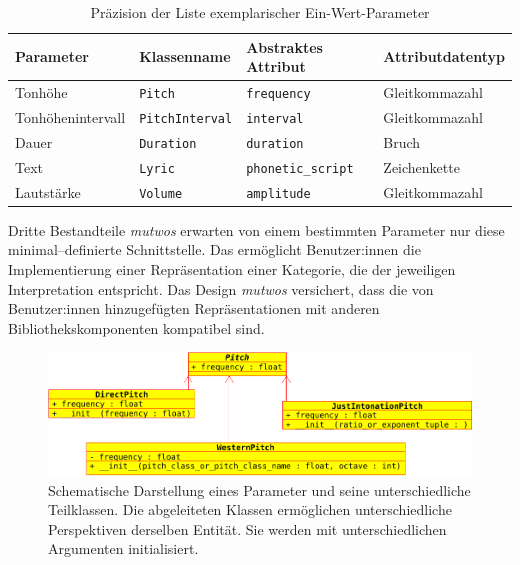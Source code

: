 \documentclass[12pt,a4paper,ngerman]{article}
\begin{document}
\begin{table}[H]
    \begin{center}
        \begin{tabular}{l l l l} 
            \hline
            Parameter & Klassenname & Abstraktes Attribut & Attributdatentyp \\ [0.5ex] 
            \hline\hline
            Tonhöhe & \texttt{Pitch} & \texttt{frequency} & Gleitkommazahl \\ 
            Tonhöhenintervall & \texttt{PitchInterval} & \texttt{interval} & Gleitkommazahl \\ 
            Dauer & \texttt{Duration} & \texttt{duration} & Bruch \\ 
            Text & \texttt{Lyric} & \texttt{phonetic\_script} & Zeichenkette \\ 
            Lautstärke & \texttt{Volume} & \texttt{amplitude} & Gleitkommazahl \\ [1ex] 
            \hline
        \end{tabular}
    \end{center}

    \caption{Präzision der Liste exemplarischer Ein-Wert-Parameter}
\end{table}

Dritte Bestandteile \emph{mutwos} erwarten von einem bestimmten Parameter nur diese minimal--definierte Schnittstelle.
Das ermöglicht Benutzer:innen die Implementierung einer Repräsentation einer Kategorie, die der jeweiligen Interpretation entspricht.
Das Design \emph{mutwos} versichert, dass die von Benutzer:innen hinzugefügten Repräsentationen mit anderen Bibliothekskomponenten kompatibel sind.

\begin{figure}[h!]
    \includegraphics[scale=0.4]{uml_diagrams/pitches.png}

    \caption{%
        Schematische Darstellung eines Parameter und seine unterschiedliche Teilklassen.
        Die abgeleiteten Klassen ermöglichen unterschiedliche Perspektiven derselben Entität.
        Sie werden mit unterschiedlichen Argumenten initialisiert.
    }

\end{figure}
\end{document}
